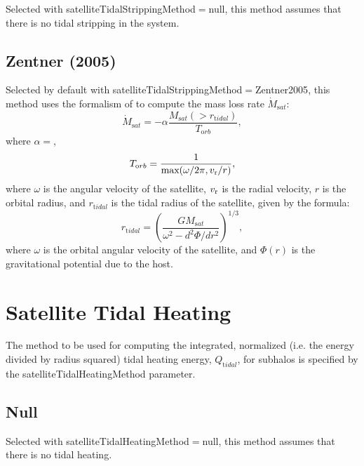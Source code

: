 Selected with {\normalfont \ttfamily satelliteTidalStrippingMethod}$=${\normalfont \ttfamily null}, this method assumes that there is no tidal stripping in the system.

\subsection{Zentner (2005)}

Selected by default with {\normalfont \ttfamily satelliteTidalStrippingMethod}$=${\normalfont \ttfamily Zentner2005}, this method uses the formalism of \cite{zentner_physics_2005} to compute the mass loss rate $\dot{M}_{\mathrm sat}$:
\begin{equation}
\dot{M}_{\mathrm sat}=-\alpha \frac{M_{\mathrm sat}(>r_{\mathrm tidal})}{T_{\mathrm orb}},
\end{equation}
where $\alpha=${\normalfont \ttfamily [satelliteTidalStrippingZentnerRate]},
\begin{equation}
T_{\mathrm orb} = {1 \over \hbox{max}(\omega/2\pi,v_{\rm r}/r)},
\end{equation}
where $\omega$ is the angular velocity of the satellite, $v_{\rm r}$ is the radial velocity, $r$ is the orbital radius, and $r_{\mathrm tidal}$ is the tidal radius of the satellite, given by the \cite{king_structure_1962} formula:
\begin{equation}
r_{\mathrm tidal}=\left(\frac{GM_{\mathrm sat}}{\omega^2-d^2\Phi/dr^2}\right)^{1/3},
\end{equation}
where $\omega$ is the orbital angular velocity of the satellite, and $\Phi(r)$ is the gravitational potential due to the host.

\section{Satellite Tidal Heating} \label{sec:satelliteTidalHeatingMethod}

The method to be used for computing the integrated, normalized (i.e. the energy divided by radius squared) tidal heating energy, $Q_{\mathrm tidal}$, for subhalos is specified by the {\normalfont \ttfamily satelliteTidalHeatingMethod} parameter.

\subsection{Null}

Selected with {\normalfont \ttfamily satelliteTidalHeatingMethod}$=${\normalfont \ttfamily null}, this method assumes that there is no tidal heating.

